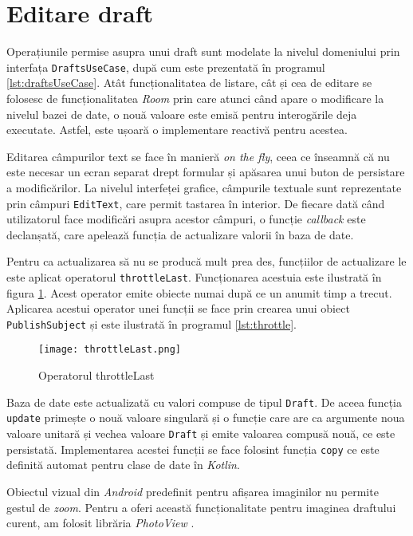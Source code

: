\section{Editare draft}

Operațiunile permise asupra unui draft sunt modelate la nivelul domeniului prin interfața \texttt{DraftsUseCase}, după cum este prezentată în programul \ref{lst:draftsUseCase}. Atât funcționalitatea de listare, cât și cea de editare se folosesc de funcționalitatea \emph{Room} prin care atunci când apare o modificare la nivelul bazei de date, o nouă valoare este emisă pentru interogările deja executate. Astfel, este ușoară o implementare reactivă pentru acestea.



Editarea câmpurilor text se face în manieră \emph{on the fly}, ceea ce înseamnă că nu este necesar un ecran separat drept formular și apăsarea unui buton de persistare a modificărilor. La nivelul interfeței grafice, câmpurile textuale sunt reprezentate prin câmpuri \texttt{EditText}, care permit tastarea în interior. De fiecare dată când utilizatorul face modificări asupra acestor câmpuri, o funcție \emph{callback} este declanșată, care apelează funcția de actualizare valorii în baza de date.

Pentru ca actualizarea să nu se producă mult prea des, funcțiilor de actualizare le este aplicat operatorul \texttt{throttleLast}. Funcționarea acestuia este ilustrată în figura \ref{fig:throttle}\cite{ThrottleLast}. Acest operator emite obiecte numai după ce un anumit timp a trecut. Aplicarea acestui operator unei funcții se face prin crearea unui obiect \texttt{PublishSubject} și este ilustrată în programul \ref{lst:throttle}.



\begin{figure}[ht]
  \centering
  \texttt{[image: throttleLast.png]}
  \caption{Operatorul throttleLast}
  \label{fig:throttle}
\end{figure}

Baza de date este actualizată cu valori compuse de tipul \texttt{Draft}. De aceea funcția \texttt{update} primește o nouă valoare singulară și o funcție care are ca argumente noua valoare unitară și vechea valoare \texttt{Draft} și emite valoarea compusă nouă, ce este persistată. Implementarea acestei funcții se face folosint funcția \texttt{copy} ce este definită automat pentru clase de date în \emph{Kotlin}.

Obiectul vizual din \emph{Android} predefinit pentru afișarea imaginilor  nu permite gestul de \emph{zoom}. Pentru a oferi această funcționalitate pentru imaginea draftului curent, am folosit librăria \emph{PhotoView} \cite{PhotoView}. 

